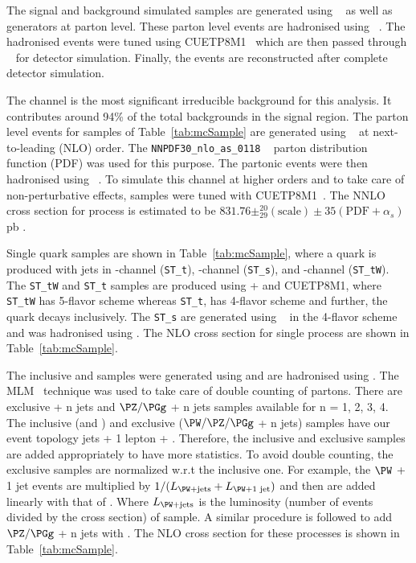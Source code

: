 The signal and background simulated samples are generated using \MGvATNLO~\cite{Alwall:2011uj, Alwall:2014hca}
as well as \POWHEG~\cite{Frixione:2007vw, Nason:2004rx, Alioli:2010xd} generators at parton level. 
These parton level events are hadronised using \PYTHIA~\cite{Sjostrand:2006za, Sjostrand:2007gs}. 
The hadronised events were tuned using  CUETP8M1~\cite{CMS-PAS-TOP-16-021} which are then passed
through \GEANTfour~\cite{Agostinelli:2002hh} for detector simulation. Finally, the events are
reconstructed after complete detector simulation. 

The \ttjets channel is the most significant irreducible background for this analysis. It
contributes around 94\% of the total backgrounds in the signal region. The parton level events 
for \ttjets samples of Table~\ref{tab:mcSample} are generated using 
\POWHEG~\cite{Frixione:2007vw, Nason:2004rx, Alioli:2010xd} at next-to-leading (NLO) order. The 
\verb|NNPDF30_nlo_as_0118| ~\cite{Ball:2014uwa} parton distribution function (PDF) was used 
for this purpose. The partonic events were then hadronised using 
\PYTHIA~\cite{Sjostrand:2006za, Sjostrand:2007gs}. To simulate this channel at higher orders and 
to take care of non-perturbative effects, \ttjets samples were tuned with 
CUETP8M1~\cite{CMS-PAS-TOP-16-021}. The NNLO cross section for \ttjets process is estimated to be 
$831.76 \pm^{20}_{29}(\text{scale}) \pm 35 (\text{PDF} + \alpha_s)$ pb \cite{Beneke:2011mq}. 

Single \PQt quark samples are shown in Table~\ref{tab:mcSample}, where a \PQt quark is produced with 
jets in \PQt-channel (\verb|ST_t|), \PQs-channel (\verb|ST_s|), and \PQt\PW-channel (\verb|ST_tW|). The
\verb|ST_tW| and \verb|ST_t| samples are produced using \POWHEG + \PYTHIA and CUETP8M1, where \verb|ST_tW| has 
5-flavor scheme whereas \verb|ST_t|, has 4-flavor scheme and further, the \PQt quark decays 
inclusively. The \verb|ST_s| are generated using \MGvATNLO~\cite{Alwall:2014hca} in the 4-flavor 
scheme and was hadronised using \PYTHIA. The NLO cross section for single \PQt process 
\cite{Aliev:2010zk, Kant:2014oha} are shown in Table~\ref{tab:mcSample}.

The inclusive \wjets and \dyjets samples were generated using \MGvATNLO and are hadronised using 
\PYTHIA. The MLM~\cite{ Alwall:2007fs} technique was used to take care of double counting of partons. There
are exclusive \PW + n jets and $\PZ/\PGg$ + n jets samples available for n = 1, 2, 3, 4. 
The inclusive (\wjets and \dyjets) and exclusive ($\PW/\PZ/\PGg$ + n jets) samples have our event 
topology  jets + 1 lepton + \MET. Therefore, the inclusive and exclusive samples are added 
appropriately to have more statistics. To avoid double counting, the exclusive samples are normalized
w.r.t the inclusive one. For example, the $\PW$ + 1 jet events are multiplied by 
$1/(L_{\wjets} + L_{\PW + \text{1 jet}})$ and then are added linearly with that of \wjets. 
Where $L_{\wjets}$ is the luminosity (number of events divided by the cross section) of \wjets sample. A similar procedure is followed to add $\PZ/\PGg$ + n jets with \dyjets. The NLO cross section for 
these processes is shown in Table~\ref{tab:mcSample}.

